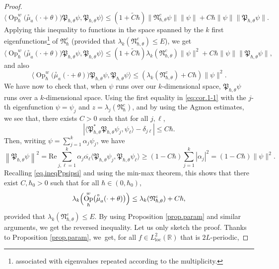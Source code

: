 \documentclass[JEP,XML,SOM,Unicode,NoFloatCountersInSection,published]{cedram}
\newcommand{\loc}{\mathrm{loc}}
\DeclareMathOperator{\Op}{Op}
\theoremstyle{plain}
\theoremstyle{definition}
\renewcommand{\Re}{\mathrm{Re}}
\begin{document}
\begin{proof}
\[
\langle\Op^w_\hbar\bigl(\overset{\circ}{\mu}_a(\cdot+\theta)\bigr)\mathfrak{P}_{\hbar,\theta}\psi,\mathfrak{P}_{\hbar,\theta}\psi\rangle\leq(1+\tilde C\hbar) \|\mathfrak{N}^c_{\hbar,\theta}\psi\| \|\psi\|+C\hbar\|\psi\|\|\mathfrak{P}_{\hbar,\theta}\psi\|.
\]
Applying this inequality to functions in the space spanned by the $k$ first eigenfunctions\footnote{associated with eigenvalues repeated according to the multiplicity.} of $\mathfrak{N}_\hbar^c$ (provided that $\lambda_k(\mathfrak{N}^c_{\hbar,\theta})\leq E$), we get
\[
\langle \Op^w_\hbar\bigl(\overset{\circ}{\mu}_a(\cdot+\theta)\bigr)\mathfrak{P}_{\hbar,\theta}\psi,\mathfrak{P}_{\hbar,\theta}\psi\rangle\leq (1+\tilde C\hbar) \lambda_k(\mathfrak{N}^c_{\hbar,\theta})\|\psi\|^2+ C\hbar\|\psi\|\|\mathfrak{P}_{\hbar,\theta}\psi\|,
\]
and also
\begin{equation}\label{eq.ineqPpsipsi}
\langle\Op^w_\hbar\bigl(\overset{\circ}{\mu}_a(\cdot+\theta)\bigr)\mathfrak{P}_{\hbar,\theta}\psi,\mathfrak{P}_{\hbar,\theta}\psi\rangle\leq (\lambda_k(\mathfrak{N}^c_{\hbar,\theta})+C\hbar)\|\psi\|^2.
\end{equation}
We have now to check that, when $\psi$ runs over our $k$-dimensional space, $\mathfrak{P}_{\hbar,\theta}\psi$ runs over a $k$-dimensional space. Using the first equality in \eqref{eq:cor.1-1} with the $j$-th eigenfunction $\psi=\psi_j$ and $z=\lambda_j(\mathfrak{N}_\hbar^c)$, and by using the Agmon estimates, we see that, there exists $C>0$ such that for all $j, \ell$,
\[
\left|\langle \mathfrak{P}^*_{\hbar,\theta}\mathfrak{P}_{\hbar,\theta}\psi_j,\psi_\ell\rangle-\delta_{j\ell}\right|\leq C\hbar.
\]
Then, writing $\psi=\sum_{j=1}^k\alpha_j\psi_j$, we have
\begin{equation}\label{eq.Ppsipsi}
\left\|\mathfrak{P}_{\hbar,\theta}\psi\right\|^2=\Re\sum_{j,\ell=1}^k\alpha_j\overline{\alpha_\ell}\langle\mathfrak{P}_{\hbar,\theta}\psi_j,\mathfrak{P}_{\hbar,\theta}\psi_\ell\rangle\geq (1-C\hbar)\sum_{j=1}^k|\alpha_j|^2=(1-C\hbar)\|\psi\|^2.
\end{equation}
Recalling \eqref{eq.ineqPpsipsi} and using the min-max theorem, this shows that there exist $C,\hbar_0>0$ such that for all $\hbar\in(0,\hbar_0)$,
\[
\lambda_k\Bigl(\Op^w_\hbar\bigl(\overset{\circ}{\mu}_a(\cdot+\theta)\bigr)\Bigr)\leq \lambda_k(\mathfrak{N}^c_{\hbar,\theta})+C\hbar,
\]
provided that $\lambda_k(\mathfrak{N}^c_{\hbar,\theta})\leq E$. By using Proposition \ref{prop.param} and similar arguments, we get the reversed inequality. Let us only sketch the proof. Thanks to Proposition \ref{prop.param}, we~get, for all $f\in L^2_{\loc}(\mathbb{R})$ that is $2L$-periodic,

\end{proof}
\end{document}
